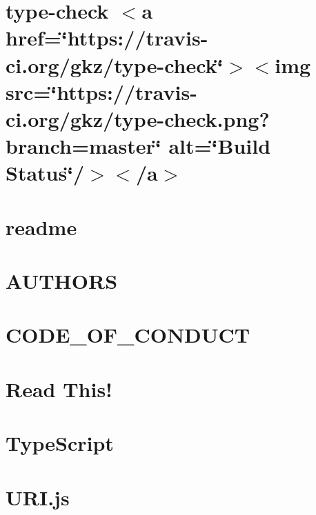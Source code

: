 \let\mypdfximage\pdfximage\def\pdfximage{\immediate\mypdfximage}\documentclass[twoside]{book}
\newcommand{\+}{\discretionary{\mbox{\scriptsize$\hookleftarrow$}}{}{}}
\begin{document}
\chapter{type-\/check $<$a href=\char`\"{}https\+://travis-\/ci.\+org/gkz/type-\/check\char`\"{}$>$$<$img src=\char`\"{}https\+://travis-\/ci.\+org/gkz/type-\/check.\+png?branch=master\char`\"{} alt=\char`\"{}\+Build Status\char`\"{}/$>$$<$/a$>$}
\label{md_heap-visualizer_node_modules_type-check__r_e_a_d_m_e}

\chapter{readme}
\label{md_heap-visualizer_node_modules_type-fest_readme}

\chapter{A\+U\+T\+H\+O\+RS}
\label{md_heap-visualizer_node_modules_typescript__a_u_t_h_o_r_s}

\chapter{C\+O\+D\+E\+\_\+\+O\+F\+\_\+\+C\+O\+N\+D\+U\+CT}
\label{md_heap-visualizer_node_modules_typescript__c_o_d_e__o_f__c_o_n_d_u_c_t}

\chapter{Read This!}
\label{md_heap-visualizer_node_modules_typescript_lib__r_e_a_d_m_e}

\chapter{Type\+Script}
\label{md_heap-visualizer_node_modules_typescript__r_e_a_d_m_e}

\chapter{U\+R\+I.\+js}
\label{md_heap-visualizer_node_modules_uri-js__r_e_a_d_m_e}

\end{document}
